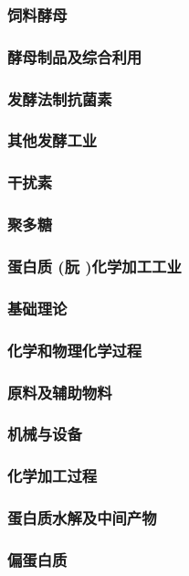 \documentclass[UTF8]{../../ApplicationUniverse}
\begin{document}
        \subsubsection{饲料酵母}
        \subsubsection{酵母制品及综合利用}
    \subsubsection{发酵法制抗菌素}
    \subsubsection{其他发酵工业}
        \subsubsection{干扰素}
        \subsubsection{聚多糖}
\subsubsection{蛋白质 (朊 )化学加工工业}
    \subsubsection{基础理论}
    \subsubsection{化学和物理化学过程}
    \subsubsection{原料及辅助物料}
    \subsubsection{机械与设备}
    \subsubsection{化学加工过程}
        \subsubsection{蛋白质水解及中间产物}
            \subsubsection{偏蛋白质}
\end{document}
